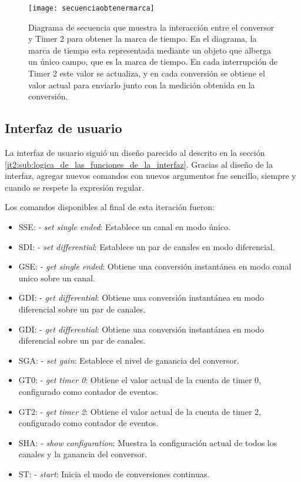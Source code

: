 \begin{figure}[h]
  \centering
  \texttt{[image: secuenciaobtenermarca]}
  \caption[Diagrama de secuencia para la obtención de una marca de tiempo]{Diagrama de secuencia que muestra la interacción entre el conversor y Timer 2 para obtener la marca de tiempo. En el diagrama, la marca de tiempo esta representada mediante un objeto que alberga un único campo, que es la marca de tiempo. En cada interrupción de Timer 2 este valor se actualiza, y en cada conversión se obtiene el valor actual para enviarlo junto con la medición obtenida en la conversión.}\label{it5:fig:secuenciaobtenermarca}
\end{figure}



\subsection{Interfaz de usuario} %
\label{it5:sub:interfaz_de_usuario}

La interfaz de usuario siguió un diseño parecido al descrito en la sección \ref{it2:sub:logica_de_las_funciones_de_la_interfaz}. Gracias al diseño de la interfaz, agregar nuevos comandos con nuevos argumentos fue sencillo, siempre y cuando se respete la expresión regular.

Los comandos disponibles al final de esta iteración fueron:

\begin{itemize}
  \item SSE: - \textit{set single ended}: Establece un canal en modo único.
  \item SDI: - \textit{set differential}: Establece un par de canales en modo diferencial.
  \item GSE: - \textit{get single ended}: Obtiene una conversión instantánea en modo canal unico sobre un canal.
  \item GDI: - \textit{get differential}: Obtiene una conversión instantánea en modo diferencial sobre un par de canales.
  \item GDI: - \textit{get differential}: Obtiene una conversión instantánea en modo diferencial sobre un par de canales.
  \item SGA: - \textit{set gain}: Establece el nivel de ganancia del conversor.
  \item GT0: - \textit{get timer 0}: Obtiene el valor actual de la cuenta de timer 0, configurado como contador de eventos.
  \item GT2: - \textit{get timer 2}: Obtiene el valor actual de la cuenta de timer 2, configurado como contador de eventos.
  \item SHA: - \textit{show configuration}: Muestra la configuración actual de todos los canales y la ganancia del conversor.
  \item ST: - \textit{start}: Inicia el modo de conversiones continuas.
\end{itemize}

